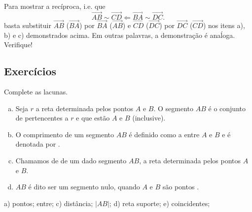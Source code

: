 \begin{resol}
  Para mostrar a recíproca, i.e. que
  \begin{equation}
    \overrightarrow{AB}\sim \overrightarrow{CD} \Leftarrow \overrightarrow{BA}\sim \overrightarrow{DC}.
  \end{equation}
  basta substituir $\overrightarrow{AB}$ ($\overrightarrow{BA}$) por $\overrightarrow{BA}$ ($\overrightarrow{AB}$) e $\overrightarrow{CD}$ ($\overrightarrow{DC}$) por $\overrightarrow{DC}$ ($\overrightarrow{CD}$) nos itens a), b) e c) demonstrados acima. Em outras palavras, a demonstração é anaĺoga. Verifique!
\end{resol}

\subsection{Exercícios}

\begin{exer}
  Complete as lacunas.
  \begin{enumerate}[a)]
    \item Seja $r$ a reta determinada pelos pontos $A$ e $B$. O segmento $AB$ é o conjunto de \underline{\phantom{pontos}} pertencentes a $r$ e que estão \underline{\phantom{entre}} $A$ e $B$ (inclusive). 
    \item O comprimento de um segmento $AB$ é definido como a \underline{\phantom{distância}} entre $A$ e $B$ e é denotada por \underline{\phantom{|AB|}}.
    \item Chamamos de \underline{\phantom{reta suporte}} de um dado segmento $AB$, a reta determinada pelos pontos $A$ e $B$.
    \item $AB$ é dito ser um segmento nulo, quando $A$ e $B$ são pontos \underline{\phantom{coincidentes}}.
  \end{enumerate}
\end{exer}
\begin{resp}
  a) pontos; entre; c) distância; $|AB|$; d) reta suporte; e) coincidentes;
\end{resp}


